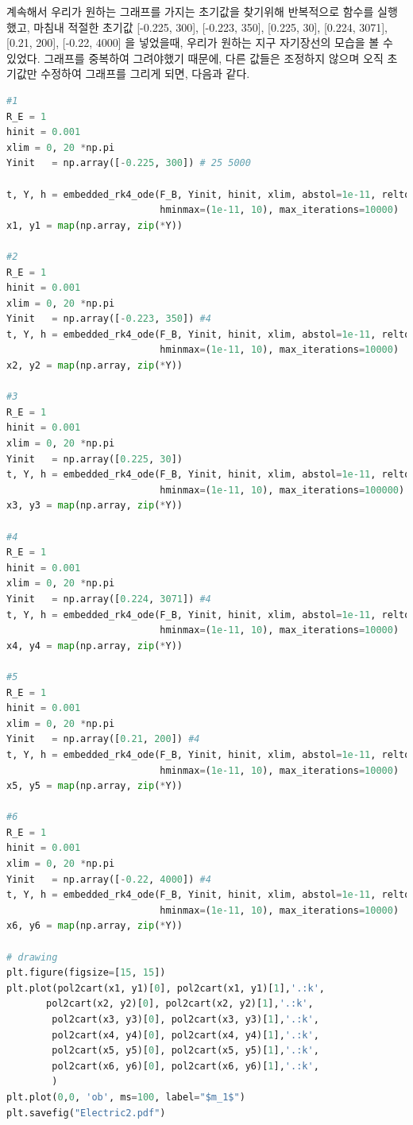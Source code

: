 \documentclass[11pt]{article}
\begin{document}
계속해서 우리가 원하는 그래프를 가지는 초기값을 찾기위해 반복적으로 함수를 실행했고, 마침내 적절한 초기값 [-0.225, 300], [-0.223, 350], [0.225, 30], [0.224, 3071], [0.21, 200], [-0.22, 4000] 을 넣었을때, 우리가 원하는 지구 자기장선의 모습을 볼 수 있었다. 그래프를 중복하여 그려야했기 때문에, 다른 값들은 조정하지 않으며 오직 초기값만 수정하여 그래프를 그리게 되면, 다음과 같다.

\begin{lstlisting}[language=Python]
#1
R_E = 1
hinit = 0.001
xlim = 0, 20 *np.pi
Yinit   = np.array([-0.225, 300]) # 25 5000

t, Y, h = embedded_rk4_ode(F_B, Yinit, hinit, xlim, abstol=1e-11, reltol=1e-11,
                           hminmax=(1e-11, 10), max_iterations=10000)
x1, y1 = map(np.array, zip(*Y))

#2
R_E = 1
hinit = 0.001
xlim = 0, 20 *np.pi
Yinit   = np.array([-0.223, 350]) #4
t, Y, h = embedded_rk4_ode(F_B, Yinit, hinit, xlim, abstol=1e-11, reltol=1e-11,
                           hminmax=(1e-11, 10), max_iterations=10000)
x2, y2 = map(np.array, zip(*Y))

#3
R_E = 1
hinit = 0.001
xlim = 0, 20 *np.pi
Yinit   = np.array([0.225, 30]) 
t, Y, h = embedded_rk4_ode(F_B, Yinit, hinit, xlim, abstol=1e-11, reltol=1e-11,
                           hminmax=(1e-11, 10), max_iterations=100000)
x3, y3 = map(np.array, zip(*Y))

#4
R_E = 1
hinit = 0.001
xlim = 0, 20 *np.pi
Yinit   = np.array([0.224, 3071]) #4
t, Y, h = embedded_rk4_ode(F_B, Yinit, hinit, xlim, abstol=1e-11, reltol=1e-11,
                           hminmax=(1e-11, 10), max_iterations=10000)
x4, y4 = map(np.array, zip(*Y))

#5
R_E = 1
hinit = 0.001
xlim = 0, 20 *np.pi
Yinit   = np.array([0.21, 200]) #4
t, Y, h = embedded_rk4_ode(F_B, Yinit, hinit, xlim, abstol=1e-11, reltol=1e-11,
                           hminmax=(1e-11, 10), max_iterations=10000)
x5, y5 = map(np.array, zip(*Y))

#6
R_E = 1
hinit = 0.001
xlim = 0, 20 *np.pi
Yinit   = np.array([-0.22, 4000]) #4
t, Y, h = embedded_rk4_ode(F_B, Yinit, hinit, xlim, abstol=1e-11, reltol=1e-11,
                           hminmax=(1e-11, 10), max_iterations=10000)
x6, y6 = map(np.array, zip(*Y))

# drawing
plt.figure(figsize=[15, 15])
plt.plot(pol2cart(x1, y1)[0], pol2cart(x1, y1)[1],'.:k',
       pol2cart(x2, y2)[0], pol2cart(x2, y2)[1],'.:k',
        pol2cart(x3, y3)[0], pol2cart(x3, y3)[1],'.:k',
        pol2cart(x4, y4)[0], pol2cart(x4, y4)[1],'.:k',
        pol2cart(x5, y5)[0], pol2cart(x5, y5)[1],'.:k',
        pol2cart(x6, y6)[0], pol2cart(x6, y6)[1],'.:k',
        )
plt.plot(0,0, 'ob', ms=100, label="$m_1$")
plt.savefig("Electric2.pdf")
\end{lstlisting}
\end{document}
